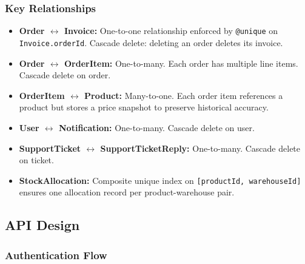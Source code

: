 \documentclass[12pt,onecolumn]{IEEEtran}
\begin{document}
\subsubsection{Key Relationships}

\begin{itemize}[leftmargin=1.5em]
  \item \textbf{Order $\leftrightarrow$ Invoice:} One-to-one relationship enforced by \texttt{@unique} on \texttt{Invoice.orderId}. Cascade delete: deleting an order deletes its invoice.
  \item \textbf{Order $\leftrightarrow$ OrderItem:} One-to-many. Each order has multiple line items. Cascade delete on order.
  \item \textbf{OrderItem $\leftrightarrow$ Product:} Many-to-one. Each order item references a product but stores a price snapshot to preserve historical accuracy.
  \item \textbf{User $\leftrightarrow$ Notification:} One-to-many. Cascade delete on user.
  \item \textbf{SupportTicket $\leftrightarrow$ SupportTicketReply:} One-to-many. Cascade delete on ticket.
  \item \textbf{StockAllocation:} Composite unique index on \texttt{[productId, warehouseId]} ensures one allocation record per product-warehouse pair.
\end{itemize}

\subsection{API Design}

\subsubsection{Authentication Flow}
\end{document}
